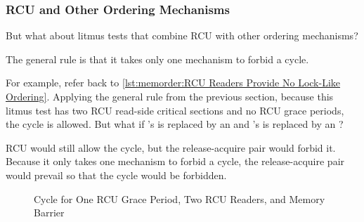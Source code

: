 \subsubsection{RCU and Other Ordering Mechanisms}
\label{sec:memorder:RCU and Other Ordering Mechanisms}

But what about litmus tests that combine RCU with other ordering
mechanisms?

The general rule is that it takes only one mechanism to forbid a cycle.

For example, refer back to
\cref{lst:memorder:RCU Readers Provide No Lock-Like Ordering}.
Applying the general rule from the previous section, because this litmus
test has two RCU read-side critical sections and no RCU grace periods,
the cycle is allowed.
But what if 's  is replaced by an
 and 's  is replaced
by an ?

RCU would still allow the cycle, but the release-acquire pair would
forbid it.
Because it only takes one mechanism to forbid a cycle, the
release-acquire pair would prevail so that the cycle would be
forbidden.

\begin{figure}
\centering
{}
\caption{Cycle for One RCU Grace Period, Two RCU Readers, and Memory Barrier}
\label{fig:memorder:Cycle for One RCU Grace Period; Two RCU Readers; and Memory Barrier}
\end{figure}

